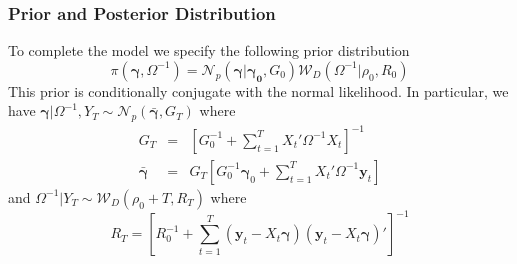 \documentclass[12pt]{article}
\begin{document}
\subsubsection{Prior and Posterior Distribution}
To complete the model we specify the following prior distribution
\begin{equation*}
\pi (\boldsymbol{\gamma},\Omega^{-1})=\mathcal{N}_{p}\left( \boldsymbol{\gamma} |\boldsymbol{\gamma_{0}},G_{0}\right)
\mathcal{W}_{D}\left(\Omega ^{-1}|\rho_{0}, R_{0}\right)
\end{equation*}
This prior is conditionally conjugate with the normal likelihood.
In particular, we have 
$\boldsymbol{\gamma}|\Omega^{-1},Y_T \sim \mathcal{N}_p\left( \bar{\boldsymbol{\gamma}},G_T \right)$
where
\begin{eqnarray*}
	G_T &=& \left[ G_0^{-1} + \sum_{t=1}^T X_t' \Omega^{-1} X_t \right]^{-1}\\
	\bar{\boldsymbol{\gamma}} &=& G_T \left[ G_0^{-1}\boldsymbol{\gamma}_0 + \sum_{t=1}^{T} X_t'\Omega^{-1}\mathbf{y}_t \right]
\end{eqnarray*}
and
$\Omega^{-1}|Y_T \sim \mathcal{W}_D\left(\rho_0 + T, R_T \right)$
where
\begin{equation*}
R_T = \left[ R_0^{-1} + \sum_{t=1}^{T} \left( \mathbf{y}_t - X_t \boldsymbol{\gamma} \right)\left( \mathbf{y}_t - X_t \boldsymbol{\gamma} \right)' \right]^{-1}
\end{equation*}
\end{document}
